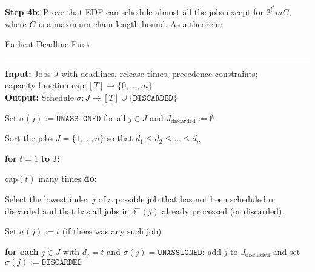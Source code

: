 \begin{multicols}{3}
\textbf{Step 4b:} Prove that EDF can schedule almost all the jobs
except for $2^{l^*}mC$, where $C$ is a maximum chain length bound. As
a theorem:

\begin{center}
{\sc Earliest Deadline First} \vspace{1mm} \hrule
\end{center}

{\bf Input:} Jobs $J$ with deadlines, release times, precedence constraints; \\capacity function $\textrm{cap} : [T] \to \{ 0,\ldots,m\}$ \\
{\bf Output:} Schedule $\sigma : J \to [T] \cup \{ \texttt{DISCARDED}\}$  
\begin{enumerate*}
\item[(1)] Set $\sigma(j) := \texttt{UNASSIGNED}$ for all $j \in J$ and
$J_{\textrm{discarded}} := \emptyset$
\item[(2)] Sort the jobs $J = \{ 1,\ldots,n\}$ so that $d_1 \leq d_2
\leq \ldots \leq d_n$
\item[(3)] \textbf{for} $t=1$ \textbf{to} $T$:
   \begin{enumerate*}
   \item[(4)] $\textrm{cap}(t)$ many times \textbf{do}:
   \begin{enumerate*}
     \item[(5)] Select the lowest index $j$ of a possible job that has not been scheduled or discarded
and that has all jobs in $\delta^-(j)$ already processed (or discarded).
     \item[(6)] Set $\sigma(j) := t$ (if there was any such job)
   \end{enumerate*}
   \item[(7)] \textbf{for each}  $j \in J$ with $d_j=t$ and $\sigma(j) =
\texttt{UNASSIGNED}$: add $j$ to $J_{\textrm{discarded}}$
and set $\sigma(j) := \texttt{DISCARDED}$
   \end{enumerate*}
\end{enumerate*}



\end{multicols}

